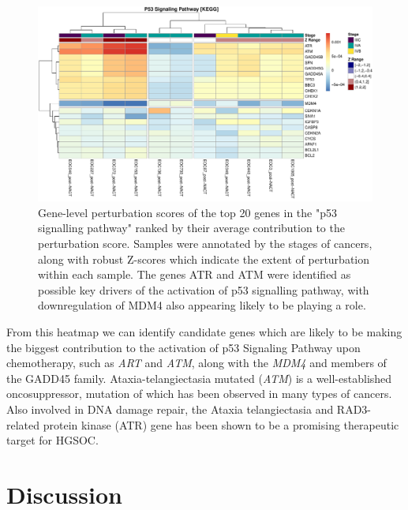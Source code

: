 \documentclass[9pt,a4paper,]{extarticle}
\begin{document}
\begin{figure}

{\centering \includegraphics[width=1\linewidth]{sSNAPPY_paper_files/figure-latex/Figure5-1} 

}

\caption{Gene-level perturbation scores of the top 20 genes in the "p53 signalling pathway" ranked by their average contribution to the perturbation score. Samples were annotated by the stages of cancers, along with robust Z-scores which indicate the extent of perturbation within each sample. The genes ATR and ATM were identified as possible key drivers of the activation of p53 signalling pathway, with downregulation of MDM4 also appearing likely to be playing a role.}\label{fig:Figure5}
\end{figure}

From this heatmap we can identify candidate genes which are likely to be making the biggest contribution to the activation of p53 Signaling Pathway upon chemotherapy, such as \emph{ART} and \emph{ATM}, along with the \emph{MDM4} and members of the GADD45 family.
Ataxia-telangiectasia mutated (\emph{ATM}) is a well-established oncosuppressor\citep{Moslemi2021}, mutation of which has been observed in many types of cancers\citep{Choi2016}.
Also involved in DNA damage repair, the Ataxia telangiectasia and RAD3-related protein kinase (ATR) gene has been shown to be a promising therapeutic target for HGSOC\citep{Li2022}.

\hypertarget{discussion}{%
\section{Discussion}\label{discussion}}
\end{document}
